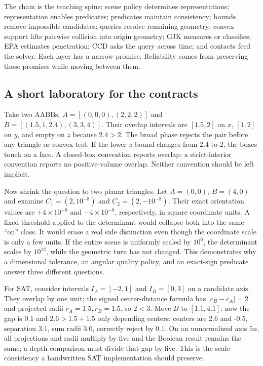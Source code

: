 The chain is the teaching spine: scene policy determines representations; representation enables predicates; predicates maintain consistency; bounds remove impossible candidates; queries resolve remaining geometry; convex support lifts pairwise collision into origin geometry; GJK measures or classifies; EPA estimates penetration; CCD asks the query across time; and contacts feed the solver. Each layer has a narrow promise. Reliability comes from preserving those promises while moving between them.

\subsection{A short laboratory for the contracts}\label{03-visual-computing-i-ch020-a-short-laboratory-for-the-contracts}

\hypertarget{03-visual-computing-i-ch020-a-short-laboratory-for-the-contracts}{}

Take two AABBs, \(A=[(0,0,0),(2,2,2)]\) and \(B=[(1.5,1,2.4),(3,3,4)]\). Their overlap intervals are \([1.5,2]\) on \(x\), \([1,2]\) on \(y\), and empty on \(z\) because \(2.4>2\). The broad phase rejects the pair before any triangle or convex test. If the lower \(z\) bound changes from \(2.4\) to \(2\), the boxes touch on a face. A closed-box convention reports overlap; a strict-interior convention reports no positive-volume overlap. Neither convention should be left implicit.

Now shrink the question to two planar triangles. Let \(A=(0,0)\), \(B=(4,0)\) and examine \(C_1=(2,10^{-8})\) and \(C_2=(2,-10^{-8})\). Their exact orientation values are \(+4\times10^{-8}\) and \(-4\times10^{-8}\), respectively, in square coordinate units. A fixed threshold  applied to the determinant would collapse both into the same ``on'' class. It would erase a real side distinction even though the coordinate scale is only a few units. If the entire scene is uniformly scaled by \(10^6\), the determinant scales by \(10^{12}\), while the geometric turn has not changed. This demonstrates why a dimensional tolerance, an angular quality policy, and an exact-sign predicate answer three different questions.

For SAT, consider intervals \(I_A=[-2,1]\) and \(I_B=[0,3]\) on a candidate axis. They overlap by one unit; the signed center-distance formula has \(|c_B-c_A|=2\) and projected radii \(r_A=1.5,r_B=1.5\), so \(2<3\). Move \(B\) to \([1.1,4.1]\): now the gap is \(0.1\) and \(2.6>1.5+1.5\) only depending centers: centers are 2.6 and -0.5, separation 3.1, sum radii 3.0, correctly reject by 0.1. On an unnormalized axis \(5n\), all projections and radii multiply by five and the Boolean result remains the same; a depth comparison must divide that gap by five. This is the scale consistency a handwritten SAT implementation should preserve.

